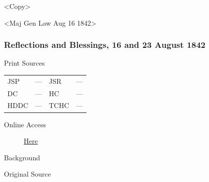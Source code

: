 				<Copy>

				<Maj Gen Law Aug 16 1842>
				
		\subsubsection{Reflections and Blessings, 16 and 23 August 1842}
			\label{EMS-1842-JS-16-23-AUG-1842}
			
			\begin{description}
				\item[Print Sources]
			\end{description}

			\begin{tabular}{p{0.5in}p{1in}p{0.5in}p{1in}}
				JSP	 	& ---		& JSR 		& --- \\
				DC	 	& ---		& HC 		& --- \\
				HDDC 	& ---		& TCHC 		& --- \\
			\end{tabular}
			
			\begin{description}
				\item[Online Access] \href{https://www.josephsmithpapers.org/paper-summary/reflections-and-blessings-16-and-23-august-1842/1}{Here}
			\end{description}
			
			\begin{description}
				\item[Background]
			\end{description}
			
			
			\begin{description}
				\item[Original Source]
			\end{description}
			
			
